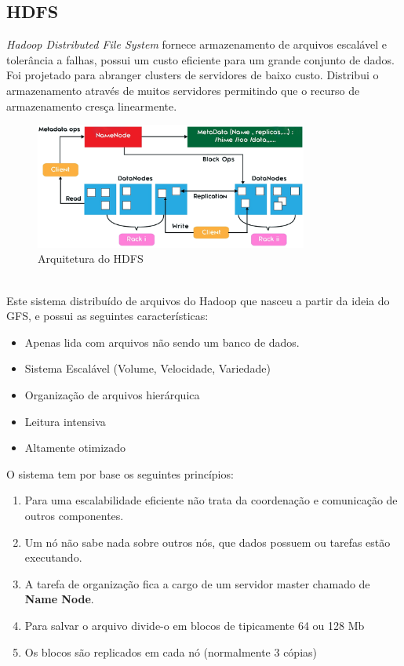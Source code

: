 \documentclass[a4paper,11pt]{article}
\begin{document}
\subsection{HDFS}
\textit{Hadoop Distributed File System} fornece armazenamento de arquivos escalável e tolerância a falhas, possui um custo eficiente para um grande conjunto de dados. Foi projetado para abranger clusters de servidores de baixo custo. Distribui o armazenamento através de muitos servidores permitindo que o recurso de armazenamento cresça linearmente.
\begin{figure}[!htb]
	\centering
	\includegraphics[width=0.8\textwidth]{imgHadoop/hdfs.png}
	\caption{Arquitetura do HDFS}
\end{figure} \\
Este sistema distribuído de arquivos do Hadoop que nasceu a partir da ideia do GFS, e possui as seguintes características:
\begin{itemize}[noitemsep]
	\item Apenas lida com arquivos não sendo um banco de dados.
	\item Sistema Escalável (Volume, Velocidade, Variedade)
	\item Organização de arquivos hierárquica
	\item Leitura intensiva
	\item Altamente otimizado
\end{itemize}
O sistema tem por base os seguintes princípios:
\begin{enumerate}
	\item Para uma escalabilidade eficiente não trata da coordenação e comunicação de outros componentes.
	\item Um nó não sabe nada sobre outros nós, que dados possuem ou tarefas estão executando.
	\item A tarefa de organização fica a cargo de um servidor master chamado de \textbf{Name Node}.
	\item Para salvar o arquivo divide-o em blocos de tipicamente 64 ou 128 Mb
\item Os blocos são replicados em cada nó (normalmente 3 cópias)
\end{enumerate}
\end{document}
